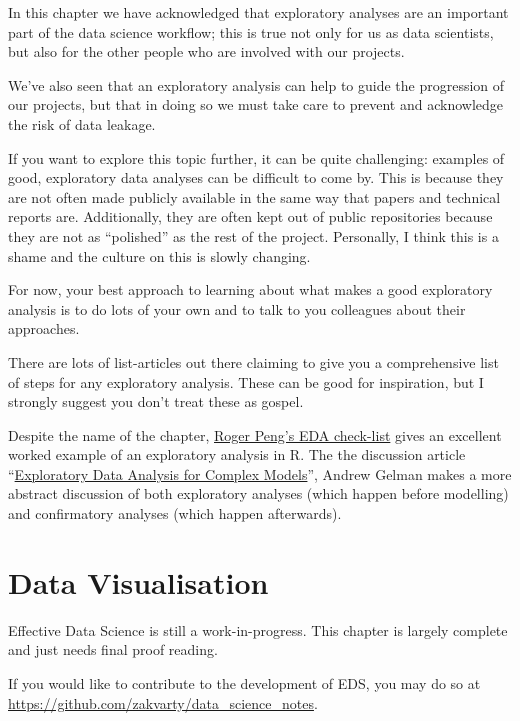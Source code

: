 \documentclass[
  12pt,
]{book}
\begin{document}
In this chapter we have acknowledged that exploratory analyses are an important part of the data science workflow; this is true not only for us as data scientists, but also for the other people who are involved with our projects.

We've also seen that an exploratory analysis can help to guide the progression of our projects, but that in doing so we must take care to prevent and acknowledge the risk of data leakage.

If you want to explore this topic further, it can be quite challenging: examples of good, exploratory data analyses can be difficult to come by. This is because they are not often made publicly available in the same way that papers and technical reports are. Additionally, they are often kept out of public repositories because they are not as ``polished'' as the rest of the project. Personally, I think this is a shame and the culture on this is slowly changing.

For now, your best approach to learning about what makes a good exploratory analysis is to do lots of your own and to talk to you colleagues about their approaches.

There are lots of list-articles out there claiming to give you a comprehensive list of steps for any exploratory analysis. These can be good for inspiration, but I strongly suggest you don't treat these as gospel.

Despite the name of the chapter, \href{https://bookdown.org/rdpeng/exdata/exploratory-data-analysis-checklist.html\#follow-up-questions}{Roger Peng's EDA check-list} gives an excellent worked example of an exploratory analysis in R. The the discussion article ``\href{http://www.stat.columbia.edu/~gelman/research/published/p755.pdf}{Exploratory Data Analysis for Complex Models}'', Andrew Gelman makes a more abstract discussion of both exploratory analyses (which happen before modelling) and confirmatory analyses (which happen afterwards).

\hypertarget{edav-visualisation}{%
\chapter{Data Visualisation}\label{edav-visualisation}}

Effective Data Science is still a work-in-progress. This chapter is largely complete and just needs final proof reading.

If you would like to contribute to the development of EDS, you may do so at \url{https://github.com/zakvarty/data_science_notes}.
\end{document}
